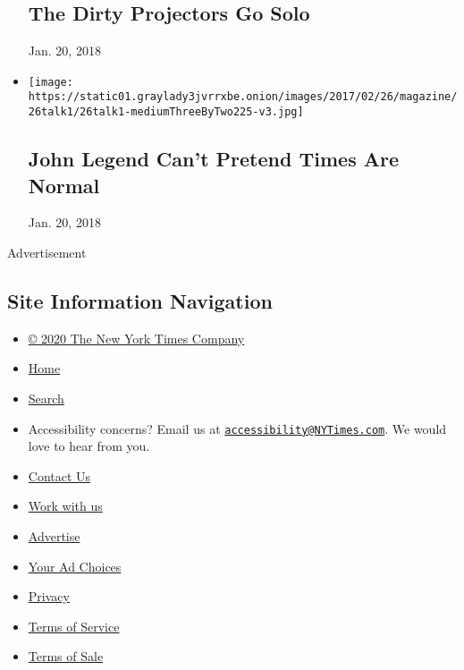 \begin{itemize}
  \hypertarget{the-dirty-projectors-go-solo}{%
  \subsection{The Dirty Projectors Go
  Solo}\label{the-dirty-projectors-go-solo}}

  Jan. 20, 2018
\item
  \href{https://www.nytimes3xbfgragh.onion/2017/02/21/magazine/john-legend-cant-pretend-times-are-normal.html}{}

  \texttt{[image: https://static01.graylady3jvrrxbe.onion/images/2017/02/26/magazine/26talk1/26talk1-mediumThreeByTwo225-v3.jpg]}

  \hypertarget{john-legend-cant-pretend-times-are-normal}{%
  \subsection{John Legend Can't Pretend Times Are
  Normal}\label{john-legend-cant-pretend-times-are-normal}}

  Jan. 20, 2018
\end{itemize}

Advertisement

\hypertarget{site-information-navigation}{%
\subsection{Site Information
Navigation}\label{site-information-navigation}}

\begin{itemize}
\tightlist
\item
  \href{https://help.nytimes3xbfgragh.onion/hc/en-us/articles/115014792127-Copyright-notice}{©
  2020 The New York Times Company}
\item
  \href{https://www.nytimes3xbfgragh.onion}{Home}
\item
  \href{https://www.nytimes3xbfgragh.onion/search/}{Search}
\item
  Accessibility concerns? Email us at
  \href{mailto:accessibility@NYTimes.com}{\nolinkurl{accessibility@NYTimes.com}}.
  We would love to hear from you.
\item
  \href{https://help.nytimes3xbfgragh.onion/hc/en-us/articles/115015385887-Contact-Us}{Contact
  Us}
\item
  \href{https://www.nytco.com/careers/}{Work with us}
\item
  \href{https://nytmediakit.com/}{Advertise}
\item
  \href{https://help.nytimes3xbfgragh.onion/hc/en-us/articles/115014892108-Privacy-policy\#pp}{Your
  Ad Choices}
\item
  \href{https://help.nytimes3xbfgragh.onion/hc/en-us/articles/115014892108-Privacy-policy}{Privacy}
\item
  \href{https://help.nytimes3xbfgragh.onion/hc/en-us/articles/115014893428-Terms-of-service}{Terms
  of Service}
\item
  \href{https://help.nytimes3xbfgragh.onion/hc/en-us/articles/115014893968-Terms-of-sale}{Terms
  of Sale}
\end{itemize}

